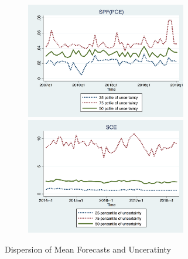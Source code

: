 \documentclass[12pt]{article}
\begin{document}
\begin{figure}[ht]
\begin{subfigure}[b]{0.5\textwidth}
		\smallskip
		\includegraphics[width=7cm]{figures/IQRvarPCEQ.png}
		\smallskip
		\includegraphics[width=7cm]{figures/IQRvarSCEM.png}
		\end{subfigure}
		\caption{Dispersion of Mean Forecasts and Unceratinty }
		\label{IQR_Unceratitny}
	\end{figure}
	
\end{document}
